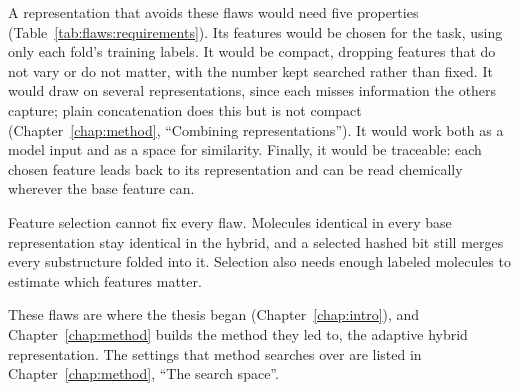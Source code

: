 A representation that avoids these flaws would need five properties (Table~\ref{tab:flaws:requirements}). Its features would be chosen for the task, using only each fold's training labels. It would be compact, dropping features that do not vary or do not matter, with the number kept searched rather than fixed. It would draw on several representations, since each misses information the others capture; plain concatenation does this but is not compact (Chapter~\ref{chap:method}, ``Combining representations''). It would work both as a model input and as a space for similarity. Finally, it would be traceable: each chosen feature leads back to its representation and can be read chemically wherever the base feature can.

Feature selection cannot fix every flaw. Molecules identical in every base representation stay identical in the hybrid, and a selected hashed bit still merges every substructure folded into it. Selection also needs enough labeled molecules to estimate which features matter.

These flaws are where the thesis began (Chapter~\ref{chap:intro}), and Chapter~\ref{chap:method} builds the method they led to, the adaptive hybrid representation. The settings that method searches over are listed in Chapter~\ref{chap:method}, ``The search space''.



